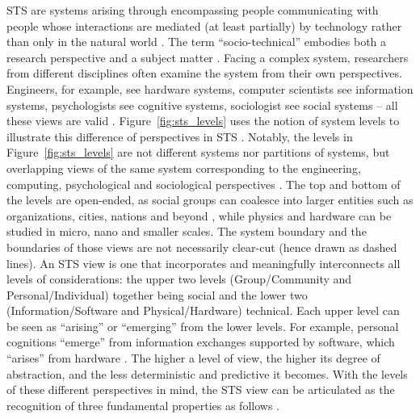 STS are systems arising through encompassing people communicating with people whose interactions are mediated (at least partially) by technology rather than only in the natural world \cite{Whitworth2009}.
The term ``socio-technical'' embodies both a research perspective and a subject matter \cite{Lee2001}. Facing a complex system, researchers from different disciplines often examine the system from their own perspectives. Engineers, for example, see hardware systems, computer scientists see information systems, psychologists see cognitive systems, sociologist see social systems -- all these views are valid \cite{Whitworth2013}. 
Figure~\ref{fig:sts_levels} uses the notion of system levels to illustrate this  difference of perspectives in STS \cite{Whitworth2009,Whitworth2013}. Notably, the levels in Figure~\ref{fig:sts_levels} are not different systems nor partitions of systems, but overlapping views of the same system corresponding to the engineering, computing, psychological and sociological perspectives \cite{Whitworth2009}. The top and bottom of the levels are open-ended, 
as social groups can coalesce into larger entities such as organizations, cities, nations and beyond \cite{Whitworth2009a}, while physics and hardware can be studied in micro, nano and smaller scales. The system boundary and the boundaries of those views are not necessarily clear-cut (hence drawn as dashed lines). An STS view is one that incorporates and meaningfully interconnects all levels of considerations: the upper two levels (Group/Community and Personal/Individual) together being social and the lower two (Information/Software and Physical/Hardware) technical. Each upper level can be seen as   ``arising'' or ``emerging'' from the lower levels. For example, personal cognitions ``emerge'' from information exchanges supported by software, which ``arises'' from hardware \cite{Whitworth2009}. The higher a level of view, the higher its degree of abstraction, and the less deterministic and predictive it becomes.  
% 
With the levels of these different perspectives in mind, the STS view can be articulated as the recognition of three fundamental properties as follows \cite{Sawyer2014}. 
%
%
